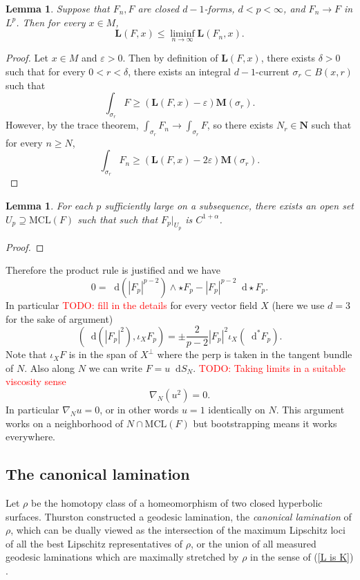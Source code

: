 \documentclass[reqno,11pt]{amsart}
\newcommand{\NN}{\mathbf{N}}
\newcommand*\dif{\mathop{}\!\mathrm{d}}
\newcommand{\MCL}{\mathrm{MCL}}
\newcommand{\Mass}{\mathbf M}
\newcommand{\Comass}{\mathbf L}
\newcommand{\dfn}[1]{\emph{#1}\index{#1}}
\newtheorem{lemma}[theorem]{Lemma}
\theoremstyle{definition}
\numberwithin{equation}{section}
\newcommand\todo[1]{\textcolor{red}{TODO: #1}}
\begin{document}
\begin{lemma}
Suppose that $F_n, F$ are closed $d - 1$-forms, $d < p < \infty$, and $F_n \to F$ in $L^p$.
Then for every $x \in M$,
$$\Comass(F, x) \leq \liminf_{n \to \infty} \Comass(F_n, x).$$
\end{lemma}
\begin{proof}
Let $x \in M$ and $\varepsilon > 0$.
Then by definition of $\Comass(F, x)$, there exists $\delta > 0$ such that for every $0 < r < \delta$, there exists an integral $d - 1$-current $\sigma_r \subset B(x, r)$ such that 
$$\int_{\sigma_r} F \geq (\Comass(F, x) - \varepsilon) \Mass(\sigma_r).$$
However, by the trace theorem, $\int_{\sigma_r} F_n \to \int_{\sigma_r} F$, so there exists $N_r \in \NN$ such that for every $n \geq N$,
$$\int_{\sigma_r} F_n \geq (\Comass(F, x) - 2 \varepsilon) \Mass(\sigma_r).$$

\end{proof}

\begin{lemma}
For each $p$ sufficiently large on a subsequence, there exists an open set $U_p \supseteq \MCL(F)$ such that such that $F_p|_{U_p}$ is $C^{1 + \alpha}$.
\end{lemma}
\begin{proof}

\end{proof}

Therefore the product rule is justified and we have
$$0 = \dif(|F_p|^{p - 2}) \wedge \star F_p - |F_p|^{p - 2} \dif \star F_p.$$
In particular \todo{fill in the details} for every vector field $X$ (here we use $d = 3$ for the sake of argument)
$$(\dif (|F_p|^2), \iota_X F_p) = \pm \frac{2}{p - 2} |F_p|^2 \iota_X (\dif^* F_p).$$
Note that $\iota_X F$ is in the span of $X^\perp$ where the perp is taken in the tangent bundle of $N$.
Also along $N$ we can write $F = u \dif S_N$.
\todo{Taking limits in a suitable viscosity sense}
$$\nabla_N (u^2) = 0.$$
In particular $\nabla_N u = 0$, or in other words $u = 1$ identically on $N$.
This argument works on a neighborhood of $N \cap \MCL(F)$ but bootstrapping means it works everywhere.



\subsection{The canonical lamination}
Let $\rho$ be the homotopy class of a homeomorphism of two closed hyperbolic surfaces.
Thurston constructed a geodesic lamination, the \dfn{canonical lamination} of $\rho$, which can be dually viewed as the intersection of the maximum Lipschitz loci of all the best Lipschitz representatives of $\rho$, or the union of all measured geodesic laminations which are maximally stretched by $\rho$ in the sense of (\ref{L is K}) \cite[\S8]{Thurston98}.
\end{document}
